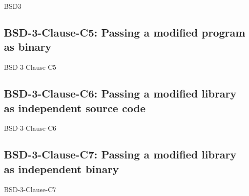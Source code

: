 \begin{license}{BSD3}
\subsection{BSD-3-Clause-C5: Passing a modified program as binary}
\begin{lsuc}{BSD-3-Clause-C5}

  \lsucmeans{\useCaseFive}
  \lsuccovers{\coversFive}

  \begin{lsucrequires}
    \lsucmandatory{\insertLicenseIntoBinary}\passingFilesCorrectly
    \lsucoptional{\addLicenseToCopyrightMessage}
  \end{lsucrequires}

  \begin{lsucprohibits}
    \lsucitem{\dontUseAuthorNames}%
  \end{lsucprohibits}
\end{lsuc}

\subsection{BSD-3-Clause-C6: Passing a modified library as independent source code}
\begin{lsuc}{BSD-3-Clause-C6}

  \lsucmeans{\useCaseSix}
  \lsuccovers{\coversSix}

  \begin{lsucrequires}
    \lsucmandatory{\keepLicenseElements}
  \end{lsucrequires}

  \begin{lsucprohibits}
    \lsucitem{\dontUseAuthorNames}%
  \end{lsucprohibits}
\end{lsuc}

\subsection{BSD-3-Clause-C7: Passing a modified library as independent binary}
\begin{lsuc}{BSD-3-Clause-C7}


\end{lsuc}
\end{license}
